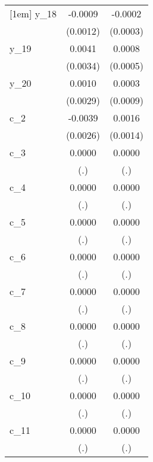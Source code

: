 {\begin{tabular}{l*{2}{c}}
[1em]
y\_18        &     -0.0009        &     -0.0002        \\
            &    (0.0012)        &    (0.0003)        \\
[1em]
y\_19        &      0.0041        &      0.0008        \\
            &    (0.0034)        &    (0.0005)        \\
[1em]
y\_20        &      0.0010        &      0.0003        \\
            &    (0.0029)        &    (0.0009)        \\
[1em]
c\_2         &     -0.0039        &      0.0016        \\
            &    (0.0026)        &    (0.0014)        \\
[1em]
c\_3         &      0.0000        &      0.0000        \\
            &         (.)        &         (.)        \\
[1em]
c\_4         &      0.0000        &      0.0000        \\
            &         (.)        &         (.)        \\
[1em]
c\_5         &      0.0000        &      0.0000        \\
            &         (.)        &         (.)        \\
[1em]
c\_6         &      0.0000        &      0.0000        \\
            &         (.)        &         (.)        \\
[1em]
c\_7         &      0.0000        &      0.0000        \\
            &         (.)        &         (.)        \\
[1em]
c\_8         &      0.0000        &      0.0000        \\
            &         (.)        &         (.)        \\
[1em]
c\_9         &      0.0000        &      0.0000        \\
            &         (.)        &         (.)        \\
[1em]
c\_10        &      0.0000        &      0.0000        \\
            &         (.)        &         (.)        \\
[1em]
c\_11        &      0.0000        &      0.0000        \\
            &         (.)        &         (.)        \\

\end{tabular}}
